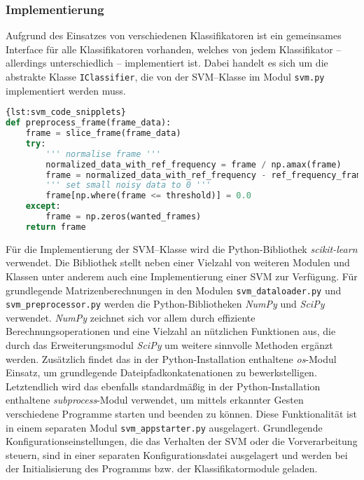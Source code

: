 \subsubsection{Implementierung}\label{sec:svm_implementation}
Aufgrund des Einsatzes von verschiedenen Klassifikatoren ist ein gemeinsames Interface für alle Klassifikatoren vorhanden, welches von jedem Klassifikator -- allerdings unterschiedlich -- implementiert ist. 
Dabei handelt es sich um die abstrakte Klasse \texttt{IClassifier}, die von der \ac{SVM}--Klasse im Modul \texttt{svm.py} implementiert werden muss.
\begin{lstlisting}[float=*,language=Python,caption={preprocess-Methode},label={lst:svm_code_snipplets}]{lst:svm_code_snipplets}
def preprocess_frame(frame_data):
	frame = slice_frame(frame_data)
	try:
		''' normalise frame '''
		normalized_data_with_ref_frequency = frame / np.amax(frame)
		frame = normalized_data_with_ref_frequency - ref_frequency_frame
		''' set small noisy data to 0 '''
		frame[np.where(frame <= threshold)] = 0.0
	except:
		frame = np.zeros(wanted_frames)
	return frame
\end{lstlisting}
Für die Implementierung der \ac{SVM}--Klasse wird die Python-Bibliothek \textit{scikit-learn} verwendet. 
Die Bibliothek stellt neben einer Vielzahl von weiteren Modulen und Klassen unter anderem auch eine Implementierung einer \ac{SVM} zur Verfügung.
Für grundlegende Matrizenberechnungen in den Modulen \texttt{svm\_dataloader.py} und \texttt{svm\_preprocessor.py} werden die Python-Bibliotheken \textit{NumPy} und \textit{SciPy} verwendet. 
\textit{NumPy} zeichnet sich vor allem durch effiziente Berechnungsoperationen und eine Vielzahl an nützlichen Funktionen aus, die durch das Erweiterungsmodul \textit{SciPy} um weitere sinnvolle Methoden ergänzt werden.
Zusätzlich findet das in der Python-Installation enthaltene \textit{os}-Modul Einsatz, um grundlegende Dateipfadkonkatenationen zu bewerkstelligen.
Letztendlich wird das ebenfalls standardmäßig in der Python-Installation enthaltene \textit{subprocess}-Modul verwendet, um mittels erkannter Gesten verschiedene Programme starten und beenden zu können.
Diese Funktionalität ist in einem separaten Modul \texttt{svm\_appstarter.py} ausgelagert.
Grundlegende Konfigurationseinstellungen, die das Verhalten der \ac{SVM} oder die Vorverarbeitung steuern, sind in einer separaten Konfigurationsdatei ausgelagert und werden bei der Initialisierung des Programms bzw. der Klassifikatormodule geladen.


